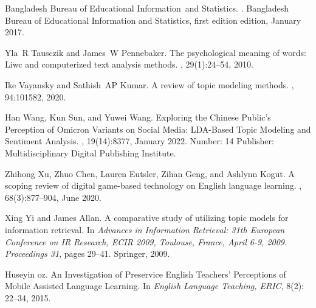 \begin{thebibliography}{10}
Bangladesh Bureau of Educational Information~and Statistics.
.
\newblock Bangladesh Bureau of Educational Information and Statistics, first
  edition edition, January 2017.

Yla~R Tausczik and James~W Pennebaker.
\newblock The psychological meaning of words: Liwc and computerized text
  analysis methods.
, 29(1):24--54, 2010.

Ike Vayansky and Sathish~AP Kumar.
\newblock A review of topic modeling methods.
, 94:101582, 2020.

Han Wang, Kun Sun, and Yuwei Wang.
\newblock Exploring the {Chinese} {Public}’s {Perception} of {Omicron}
  {Variants} on {Social} {Media}: {LDA}-{Based} {Topic} {Modeling} and
  {Sentiment} {Analysis}.
, 19(14):8377, January 2022.
\newblock Number: 14 Publisher: Multidisciplinary Digital Publishing Institute.

Zhihong Xu, Zhuo Chen, Lauren Eutsler, Zihan Geng, and Ashlynn Kogut.
\newblock A scoping review of digital game-based technology on {English}
  language learning.
,
  68(3):877--904, June 2020.

Xing Yi and James Allan.
\newblock A comparative study of utilizing topic models for information
  retrieval.
\newblock In {\em Advances in Information Retrieval: 31th European Conference
  on IR Research, ECIR 2009, Toulouse, France, April 6-9, 2009. Proceedings
  31}, pages 29--41. Springer, 2009.

Huseyin oz.
\newblock An Investigation of Preservice English Teachers' Perceptions of Mobile Assisted Language Learning.
\newblock In {\em English Language Teaching, ERIC}, 8(2): 22--34, 2015.

\end{thebibliography}
